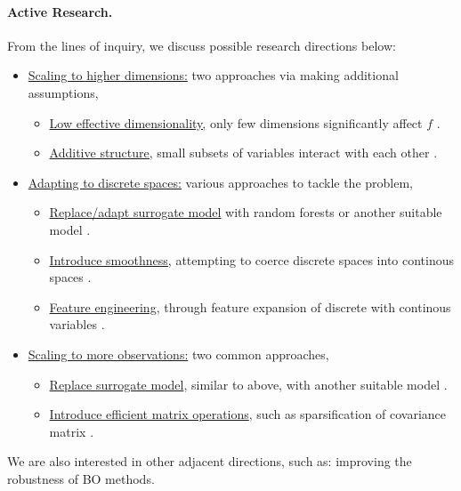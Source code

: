 \documentclass[
    american,a4paper
    ]{scrartcl}
\begin{document}
        \paragraph{Active Research.}
        From the lines of inquiry, we discuss possible research directions below:
        \begin{itemize}
            \item \underline{Scaling to higher dimensions:} two approaches via making additional assumptions,
            \begin{itemize}
                \item \underline{Low effective dimensionality,} only few dimensions significantly affect $f$ \cite{chen2012joint}.
                \item \underline{Additive structure,} small subsets of variables interact with each other \cite{kandasamy2015high}.
            \end{itemize}
            \item \underline{Adapting to discrete spaces:} various approaches to tackle the problem,
            \begin{itemize}
                \item \underline{Replace/adapt surrogate model} with random forests or another suitable model \cite{hutter2013evaluation}.
                \item \underline{Introduce smoothness}, attempting to coerce discrete spaces into continous spaces \cite{oh2019combinatorial}.
                \item \underline{Feature engineering}, through feature expansion of discrete with continous variables \cite{daxberger2019mixed}.
            \end{itemize}
            \item \underline{Scaling to more observations:} two common approaches,
            \begin{itemize}
                \item \underline{Replace surrogate model}, similar to above, with another suitable model \cite{hutter2011sequential}.
                \item \underline{Introduce efficient matrix operations}, such as sparsification of covariance matrix \cite{seeger2003fast}.
            \end{itemize}
        \end{itemize}
        We are also interested in other adjacent directions, such as: improving the robustness of BO methods.
        
\end{document}
